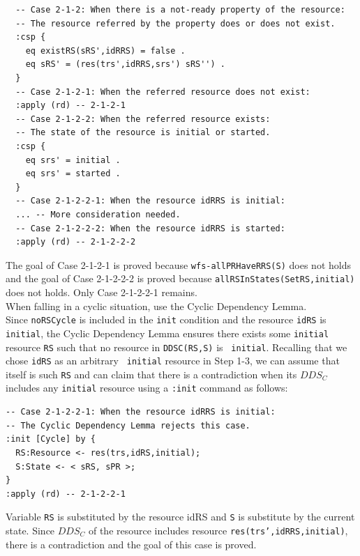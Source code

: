 \documentclass[12pt]{report}
\newcommand{\stt}[1]{{\small{\tt {#1}}}}
\begin{document}
\begin{verbatim}
  -- Case 2-1-2: When there is a not-ready property of the resource:
  -- The resource referred by the property does or does not exist.
  :csp {
    eq existRS(sRS',idRRS) = false .
    eq sRS' = (res(trs',idRRS,srs') sRS'') .
  }
  -- Case 2-1-2-1: When the referred resource does not exist:
  :apply (rd) -- 2-1-2-1
  -- Case 2-1-2-2: When the referred resource exists:
  -- The state of the resource is initial or started.
  :csp { 
    eq srs' = initial .
    eq srs' = started .
  }
  -- Case 2-1-2-2-1: When the resource idRRS is initial:
  ... -- More consideration needed.
  -- Case 2-1-2-2-2: When the resource idRRS is started:
  :apply (rd) -- 2-1-2-2-2
\end{verbatim}
The goal of Case 2-1-2-1 is proved because \stt{wfs-allPRHaveRRS(S)}
does not holds and the goal of Case 2-1-2-2-2 is proved because
\stt{allRSInStates(SetRS,initial)} does not holds.  Only Case
2-1-2-2-1 remains.\\

 When falling in a cyclic situation, use the
Cyclic Dependency Lemma. \\ Since {\tt noRSCycle} is included in the
{\tt init} condition and the resource {\tt idRS} is {\tt initial}, the
Cyclic Dependency Lemma ensures there exists some {\tt initial}
resource {\tt RS} such that no resource in \stt{DDSC(RS,S)} is {\tt
  initial}. Recalling that we chose {\tt idRS} as an arbitrary {\tt
  initial} resource in Step 1-3, we can assume that itself is such
{\tt RS} and can claim that there is a contradiction when its $DDS_C$ includes
any {\tt initial} resource using a {\tt :init} command as follows:
\begin{verbatim}
-- Case 2-1-2-2-1: When the resource idRRS is initial:
-- The Cyclic Dependency Lemma rejects this case.
:init [Cycle] by {
  RS:Resource <- res(trs,idRS,initial);
  S:State <- < sRS, sPR >;
}
:apply (rd) -- 2-1-2-2-1
\end{verbatim}
Variable {\tt RS} is substituted by the resource idRS and {\tt S} is
substitute by the current state. Since $DDS_C$ of the resource
includes resource \stt{res(trs',idRRS,initial)}, there is a
contradiction and the goal of this case is proved.
\end{document}
